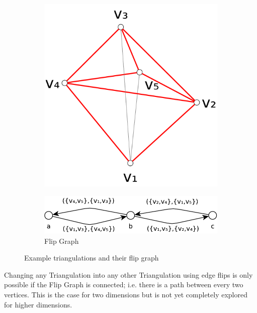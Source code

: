 \begin{figure}[ht]
\begin{subfigure}{0.3\textwidth}
    \caption{}
  \end{subfigure}
  \hspace{0em}
  \VRule
  \hspace{0em}
  \begin{subfigure}{0.3\textwidth}
    \centering
    \includegraphics[width=\textwidth]{img/example_triangulation_3.pdf}
    \caption{}
  \end{subfigure}
  
  \vspace{2em}
  \begin{subfigure}{0.7\textwidth}
    \centering
    \includegraphics[width=\textwidth]{img/example_flip_graph.pdf}
    \caption{Flip Graph}
  \end{subfigure}
  \caption{\label{fig:example_flip_graph}%
    Example triangulations and their flip graph}
\end{figure}

Changing any Triangulation into any other Triangulation using edge
flips is only possible if the Flip Graph is connected; i.e. there is
a path between every two vertices. This is the case for two dimensions
but is not yet completely explored for higher dimensions.

